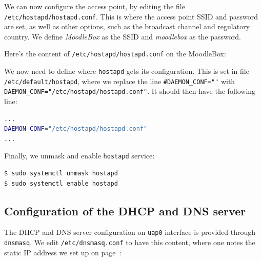 \documentclass[12pt]{article}
\begin{document}
We can now configure the access point, by editing the file \lstinline{/etc/hostapd/hostapd.conf}.
This is where the access point SSID and password are set, as well as other options, such as the broadcast channel and regulatory country.
We define \emph{MoodleBox} as the SSID and \emph{moodlebox} as the password.

Here's the content of \lstinline{/etc/hostapd/hostapd.conf} on the MoodleBox:

We now need to define where \lstinline{hostapd} gets its configuration.
This is set in file \lstinline{/etc/default/hostapd}, where we replace the line \lstinline{#DAEMON_CONF=""} with \lstinline{DAEMON_CONF="/etc/hostapd/hostapd.conf"}.
It should then have the following line:
\begin{lstlisting}[language=bash]
...
DAEMON_CONF="/etc/hostapd/hostapd.conf"
...
\end{lstlisting}

Finally, we unmask and enable \lstinline{hostapd} service:
\begin{lstlisting}[language=bash]
$ sudo systemctl unmask hostapd
$ sudo systemctl enable hostapd
\end{lstlisting}

\subsection{Configuration of the DHCP and DNS server}

The DHCP and DNS server configuration on \lstinline{uap0} interface is provided through \lstinline{dnsmasq}.
We edit \lstinline{/etc/dnsmasq.conf} to have this content, where one notes the static IP address we set up on page~\pageref{ssec-static-ip}:
\end{document}
